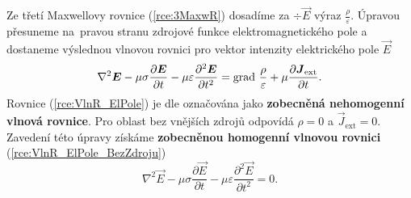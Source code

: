 Ze třetí Maxwellovy rovnice (\ref{rce:3MaxwR}) dosadíme za $\div\vec E$ výraz $\frac{\rho}{\varepsilon}$. Úpravou přesuneme na~pravou stranu zdrojové funkce elektromagnetického pole a dostaneme výslednou vlnovou rovnici pro vektor intenzity elektrického pole $\vec E$
\begin{equation}
	\nabla^{2}\mbox{\boldmath$E$} -\mu\sigma\frac{\partial\mbox{\boldmath$E$}}{\partial t}-\mu\varepsilon\frac{\partial^{2}\mbox{\boldmath$E$}}{\partial t^{2}} = \mathrm{grad}\ \frac{\rho}{\varepsilon}+\mu\frac{\partial\mbox{\boldmath$J$}_{\mathrm{ext}}}{\partial t}.
	\label{rce:VlnR_ElPole}
\end{equation}
Rovnice (\ref{rce:VlnR_ElPole}) je dle \cite{emp} označována jako {\bf zobecněná nehomogenní vlnová rovnice}. Pro oblast bez vnějších zdrojů 
odpovídá $\rho = 0$ a $\vec J_{\mathrm{ext}} = 0$. Zavedení této úpravy získáme {\bf zobecněnou homogenní vlnovou rovnici} (\ref{rce:VlnR_ElPole_BezZdroju})
\begin{equation}
	\nabla^{2}\vec E -\mu\sigma\frac{\partial\vec E}{\partial t}-\mu\varepsilon\frac{\partial^{2}\vec E}{\partial t^{2}} = 0.
	\label{rce:VlnR_ElPole_BezZdroju}
\end{equation}

